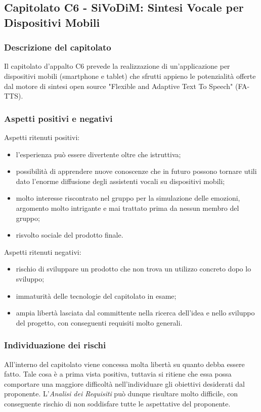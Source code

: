 \documentclass[../nStudioDiFattibilita.tex]{subfiles}
\begin{document}
	\subsection{Capitolato C6 - SiVoDiM: Sintesi Vocale per Dispositivi Mobili}
		\subsubsection{Descrizione del capitolato}
		Il capitolato d'appalto C6 prevede la realizzazione di un'applicazione per dispositivi mobili (smartphone e tablet) che sfrutti appieno le potenzialità offerte dal motore di sintesi open source "Flexible and Adaptive Text To Speech" (FA-TTS).
		\subsubsection{Aspetti positivi e negativi}
		Aspetti ritenuti positivi:
			\begin{itemize}
				\item l'esperienza può essere divertente oltre che istruttiva;
				\item possibilità di apprendere nuove conoscenze che in futuro possono tornare utili dato l'enorme diffusione degli assistenti vocali su dispositivi mobili;
				\item molto interesse riscontrato nel gruppo per la simulazione delle emozioni, argomento molto intrigante e mai trattato prima da nessun membro del gruppo;
				\item risvolto sociale del prodotto finale.
			\end{itemize}
		Aspetti ritenuti negativi:
			\begin{itemize}
				\item rischio di sviluppare un prodotto che non trova un utilizzo concreto dopo lo sviluppo;
				\item immaturità delle tecnologie del capitolato in esame;
				\item ampia libertà lasciata dal committente nella ricerca dell'idea e nello sviluppo del progetto, con conseguenti requisiti molto generali.
			\end{itemize}
		\subsubsection{Individuazione dei rischi}
		All'interno del capitolato viene concessa molta libertà su quanto debba essere fatto. Tale cosa è a prima vista positiva, tuttavia si ritiene che essa possa comportare una maggiore difficoltà nell'individuare gli obiettivi desiderati dal proponente. L'\textit{Analisi dei Requisiti} può dunque risultare molto difficile, con conseguente rischio di non soddisfare tutte le aspettative del proponente.
\end{document}
